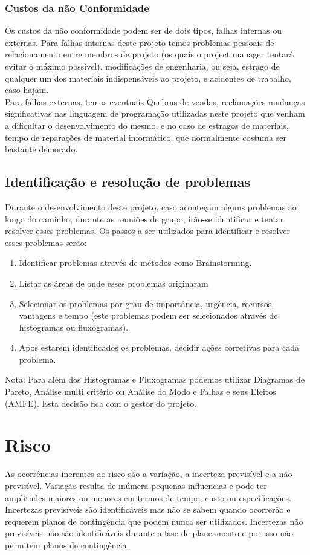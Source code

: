 \documentclass[a4paper]{article}
\begin{document}
\subsubsection{Custos da não Conformidade}
Os custos da não conformidade podem ser de dois tipos, falhas internas ou externas. Para falhas internas deste projeto temos problemas pessoais de relacionamento entre membros de projeto (os quais o project manager tentará evitar o máximo possível), modificações de engenharia, ou seja, estrago de qualquer um dos materiais indispensáveis ao projeto, e acidentes de trabalho, caso hajam.\\
Para falhas externas, temos eventuais Quebras de vendas, reclamações mudanças significativas nas linguagem de programação utilizadas neste projeto que venham a dificultar o desenvolvimento do mesmo, e no caso de estragos de materiais, tempo de reparações de material informático, que normalmente costuma ser bastante demorado.

\subsection{Identificação e resolução de problemas}
Durante o desenvolvimento deste projeto, caso aconteçam alguns problemas ao longo do caminho, durante as reuniões de grupo, irão-se identificar e tentar resolver esses problemas. Os passos a ser utilizados para identificar e resolver esses problemas serão:
\begin{enumerate}
\item Identificar problemas através de métodos como Brainstorming.
\item Listar as áreas de onde esses problemas originaram
\item Selecionar os problemas por grau de importância, urgência, recursos, vantagens e tempo (este problemas podem ser selecionados através de histogramas ou fluxogramas).
\item Após estarem identificados os problemas, decidir ações corretivas para cada problema.
\end{enumerate}

\noindent Nota: Para além dos Histogramas e Fluxogramas podemos utilizar Diagramas de Pareto, Análise multi critério ou Análise do Modo e Falhas e seus Efeitos (AMFE). Esta decisão fica com o gestor do projeto.

\newpage

\section{Risco}
As ocorrências inerentes ao risco são a variação, a incerteza previsível e a não previsível. Variação resulta de inúmera pequenas influencias e pode ter amplitudes maiores ou menores em termos de tempo, custo ou especificações. Incertezas previsíveis são identificáveis mas não se sabem quando ocorrerão e requerem planos de contingência que podem nunca ser utilizados. Incertezas não previsíveis não são identificáveis durante a fase de planeamento e por isso não permitem planos de contingência.\\
\end{document}
